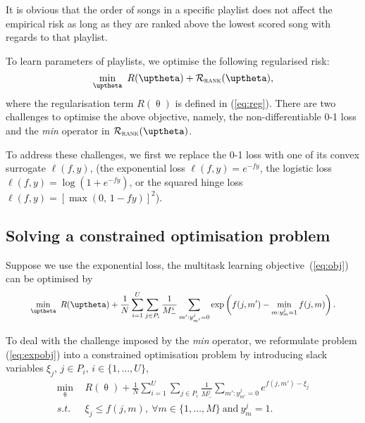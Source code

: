 It is obvious that the order of songs in a specific playlist does not affect the empirical risk as long as they are ranked 
above the lowest scored song with regards to that playlist.

To learn parameters of playlists, we optimise the following regularised risk:
$$
\min_\uptheta \ R(\uptheta) + \RCal_\textsc{rank}(\uptheta),
$$
where the regularisation term $R(\uptheta)$ is defined in (\ref{eq:reg}).
There are two challenges to optimise the above objective,
namely, the non-differentiable 0-1 loss and the \emph{min} operator in $\RCal_\textsc{rank}(\uptheta)$.

To address these challenges, we first we replace the 0-1 loss with one of its convex surrogate $\ell(f, y)$,
(\eg the exponential loss $\ell(f, y) = e^{-fy}$, the logistic loss $\ell(f, y) = \log(1 + e^{-fy})$,
or the squared hinge loss $\ell(f, y) = [\max(0, \, 1 - fy)]^2$).



\subsection{Solving a constrained optimisation problem}

Suppose we use the exponential loss, the multitask learning objective~(\ref{eq:obj}) can be optimised by
\begin{equation}
\label{eq:expobj}
\resizebox{.9\linewidth}{!}{$\displaystyle
\min_{\uptheta} \ R(\uptheta) + \frac{1}{N} \sum_{i=1}^U \sum_{j \in P_i} \frac{1}{M_-^i} 
                  \sum_{m': y_{m'}^j = 0} \exp \left(f(j, m') - \min_{m: y_m^j = 1} f(j, m) \right).
$}
\end{equation}

To deal with the challenge imposed by the \emph{min} operator, we reformulate problem (\ref{eq:expobj}) 
into a constrained optimisation problem by introducing slack variables $\xi_j, \, j \in P_i, \, i \in \{1,\dots,U\}$,
\begin{equation}
\label{eq:expobj_cons}
\begin{aligned}
\min_{\uptheta} \ \, & R(\uptheta) + \frac{1}{N} \sum_{i=1}^U \sum_{j \in P_i} \frac{1}{M_-^j} \sum_{m': y_{m'}^j = 0} e^{f(j, m') - \xi_j} \\
s.t. \ \, & \xi_j \le f(j, m), \ \forall m \in \{1,\dots,M\} \ \text{and} \ y_m^j = 1.
\end{aligned}
\end{equation}

